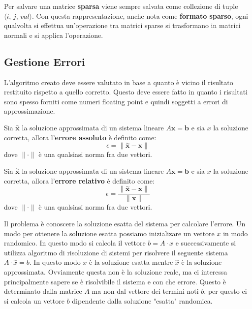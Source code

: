 Per salvare una matrice \textbf{sparsa} viene sempre salvata come collezione di
tuple $\langle i, \, j,\, val\rangle$. Con questa rappresentazione, anche nota
come \textbf{formato sparso}, ogni qualvolta si effettua un'operazione tra matrici
sparse si trasformano in matrici normali e si applica l'operazione.
\subsection{Gestione Errori}
L'algoritmo creato deve essere valutato in base a quanto è vicino il risultato
restituito rispetto a quello corretto. Questo deve essere fatto in quanto
i risultati sono spesso forniti come numeri floating point e quindi soggetti
a errori di approssimazione.

\begin{definizione}
    Sia $\stackrel{\sim}{\textbf{x}}$ la soluzione approssimata di un sistema
    lineare $A\textbf{x} = \textbf{b}$ e sia $x$ la soluzione corretta, allora
    l'\textbf{errore assoluto} è definito come:
    \begin{equation}
        \epsilon = \|\stackrel{\sim}{\textbf{x}} - \textbf{x}\|
    \end{equation}
    dove $\|\cdot\|$ è una qualsiasi norma fra due vettori.
\end{definizione}
\begin{definizione}
    Sia $\stackrel{\sim}{\textbf{x}}$ la soluzione approssimata di un sistema
    lineare $A\textbf{x} = \textbf{b}$ e sia $x$ la soluzione corretta, allora
    l'\textbf{errore relativo} è definito come:
    \begin{equation}
        \epsilon = \frac{\|\stackrel{\sim}{\textbf{x}} - \textbf{x}\|}{\|\textbf{x}\|}
    \end{equation}
    dove $\|\cdot\|$ è una qualsiasi norma fra due vettori.
\end{definizione}

Il problema è conoscere la soluzione esatta del sistema per calcolare l'errore.
Un modo per ottenere la soluzione esatta possiamo inizializare un vettore $x$ in modo 
randomico. In questo modo si calcola il vettore $b =A\cdot x $ e successivamente 
si utilizza algoritmo di risoluzione di sistemi per risolvere il seguente 
sistema $A\cdot \stackrel{\sim}{x} = b$. In questo modo $x$ è la soluzione esatta 
mentre  $\stackrel{\sim}{x}$ è la soluzione approssimata. Ovviamente questa non è 
la soluzione reale, ma ci interessa principalmente sapere se è risolvibile il sistema 
e con che errore. Questo è determinato dalla matrice $A$ ma non dal vettore dei
termini noti $b$, per questo ci si calcola un vettore $b$ dipendente dalla soluzione 
"esatta" randomica.

